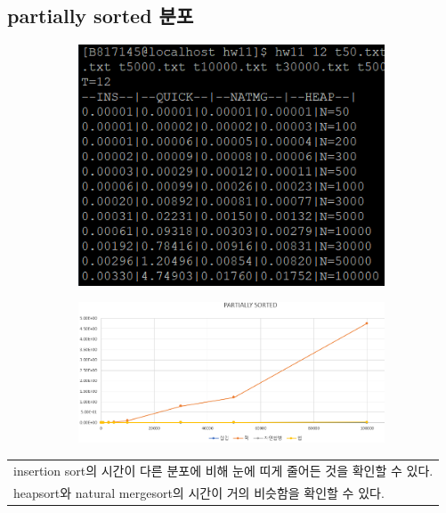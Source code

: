 \documentclass{article}
\begin{document}
\subsection{partially sorted 분포}
\begin{figure}[H]
\begin{subfigure}[ht]{.3\linewidth}\centering
\includegraphics[width=.9\linewidth]{partially2.PNG}
\end{subfigure}
\begin{subfigure}[ht]{.7\linewidth}\centering
\includegraphics[width=.9\linewidth]{partially.PNG}
\end{subfigure}
\end{figure}
\begin{table}[H]
\centering
\begin{tabular}{|m{15cm}|}
\hline
insertion sort의 시간이 다른 분포에 비해 눈에 띠게 줄어든 것을 확인할 수 있다.\\
heapsort와 natural mergesort의 시간이 거의 비슷함을 확인할 수 있다.\\
\hline
\end{tabular}
\end{table}
\end{document}
